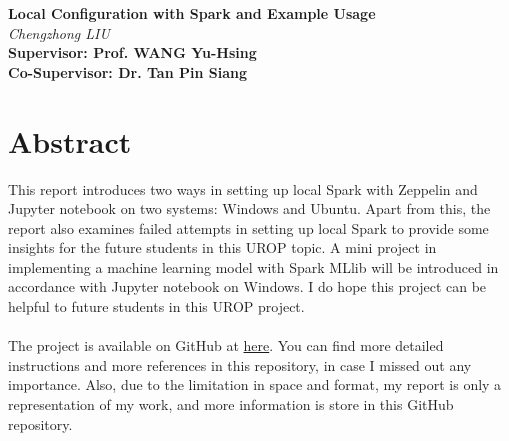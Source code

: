 \documentclass[a4paper, 12pt]{article}
\begin{document}
    \begin{center}
        \Huge\textbf{Local Configuration with Spark and Example Usage}\\
        \large\textit{Chengzhong LIU}\\
        \normalsize\textbf{Supervisor: Prof. WANG Yu-Hsing}\\
        \normalsize\textbf{Co-Supervisor: Dr. Tan Pin Siang}
    \end{center}

    \section*{Abstract}
    This report introduces two ways in setting up local Spark with Zeppelin and Jupyter notebook on 
    two systems: Windows and Ubuntu. Apart from this, the report also examines failed attempts in 
    setting up local Spark to provide some insights for the future students in this UROP topic. A 
    mini project in implementing a machine learning model with Spark MLlib will be introduced in 
    accordance with Jupyter notebook on Windows. I do hope this project can be helpful to future 
    students in this UROP project.\\
    \\
    The project is available on GitHub at \href{https://github.com/cliubf/spark_playground/}{here}. 
    You can find more detailed instructions and more references in this repository, in case I missed 
    out any importance. Also, due to the limitation in space and format, my report is only a representation 
    of my work, and more information is store in this GitHub repository.
\end{document}
